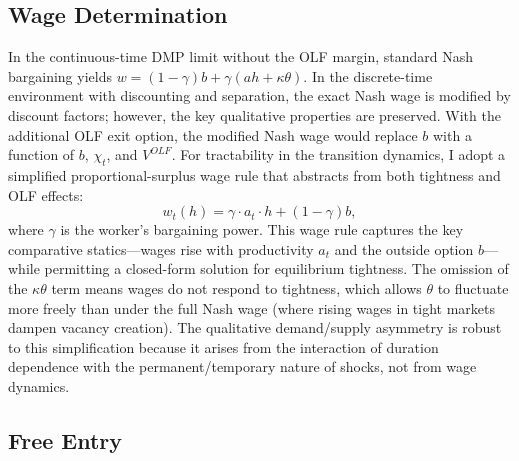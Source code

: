 \documentclass[12pt]{article}
\begin{document}
\subsection{Wage Determination}

In the continuous-time DMP limit without the OLF margin, standard Nash bargaining yields $w = (1 - \gamma)b + \gamma(ah + \kappa\theta)$. In the discrete-time environment with discounting and separation, the exact Nash wage is modified by discount factors; however, the key qualitative properties are preserved. With the additional OLF exit option, the modified Nash wage would replace $b$ with a function of $b$, $\chi_t$, and $V^{OLF}$. For tractability in the transition dynamics, I adopt a simplified proportional-surplus wage rule that abstracts from both tightness and OLF effects:
\begin{equation}
w_t(h) = \gamma \cdot a_t \cdot h + (1 - \gamma) b,
\label{eq:wage}
\end{equation}
where $\gamma$ is the worker's bargaining power. This wage rule captures the key comparative statics---wages rise with productivity $a_t$ and the outside option $b$---while permitting a closed-form solution for equilibrium tightness. The omission of the $\kappa\theta$ term means wages do not respond to tightness, which allows $\theta$ to fluctuate more freely than under the full Nash wage (where rising wages in tight markets dampen vacancy creation). The qualitative demand/supply asymmetry is robust to this simplification because it arises from the interaction of duration dependence with the permanent/temporary nature of shocks, not from wage dynamics.

\subsection{Free Entry}
\label{sec:free_entry}
\end{document}
